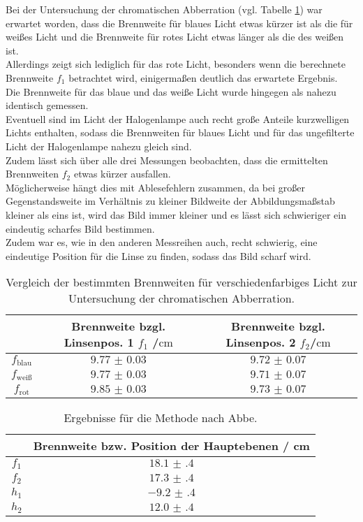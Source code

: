 Bei der Untersuchung der chromatischen Abberration (vgl. Tabelle \ref{tab:chroma}) war erwartet worden, dass die Brennweite für blaues Licht etwas kürzer ist als die für weißes Licht und die Brennweite für rotes Licht etwas länger als die des weißen ist.\\
Allerdings zeigt sich lediglich für das rote Licht, besonders wenn die berechnete Brennweite $f_\mathrm{1}$ betrachtet wird, einigermaßen deutlich das erwartete Ergebnis.
\\Die Brennweite für das blaue und das weiße Licht wurde hingegen als nahezu identisch gemessen.
\\Eventuell sind im Licht der Halogenlampe auch recht große Anteile kurzwelligen Lichts enthalten, sodass die Brennweiten für blaues Licht und für das ungefilterte Licht der Halogenlampe nahezu gleich sind.
\\ Zudem lässt sich über alle drei Messungen beobachten, dass die ermittelten Brennweiten $f_\mathrm{2}$ etwas kürzer ausfallen. \\Möglicherweise hängt dies mit Ablesefehlern zusammen, da bei großer Gegenstandsweite im Verhältnis zu kleiner Bildweite der Abbildungsmaßstab kleiner als eins ist, wird das Bild immer kleiner und es lässt sich schwieriger ein eindeutig scharfes Bild bestimmen.
\\Zudem war es, wie in den anderen Messreihen auch, recht schwierig, eine eindeutige Position für die Linse zu finden, sodass das Bild scharf wird.

\begin{table}
  \centering
  \caption{Vergleich der bestimmten Brennweiten für verschiedenfarbiges Licht zur Untersuchung der chromatischen Abberration.}
  \label{tab:chroma}
  \begin{tabular}{ccc}
    \toprule
    &Brennweite bzgl. Linsenpos. 1 $f_\mathrm{1}$ /$\si{\centi\meter}$&Brennweite bzgl. Linsenpos. 2 $f_\mathrm{2}$/$\si{\centi\meter}$\\
    \midrule
    $f_{\mathrm{blau}}$&$\num{9.77(3)}$&$\num{9.72(7)}$\\
    $f_{\mathrm{weiß}}$&$\num{9.77(3)}$&$\num{9.71(7)}$\\
    $f_{\mathrm{rot}}$&$\num{9.85(3)}$&$\num{9.73(7)}$\\
\bottomrule
\end{tabular}
\end{table}

\begin{table}
  \centering
  \caption{Ergebnisse für die Methode nach Abbe.}
  \label{tab:diskusii}
  \begin{tabular}{cc}
    \toprule
	  & Brennweite bzw. Position der Hauptebenen / \si{\centi\meter} \\
    \midrule
	$f_{1}$ & $\num{18.1(4)}$ \\
	$f_{2}$ & $\num{17.3(4)}$ \\
	$h_1$ & $-\num{9.2(4)}$ \\
	$h_2$ & $\num{12.0(4)}$ \\
\bottomrule
\end{tabular}
\end{table}
